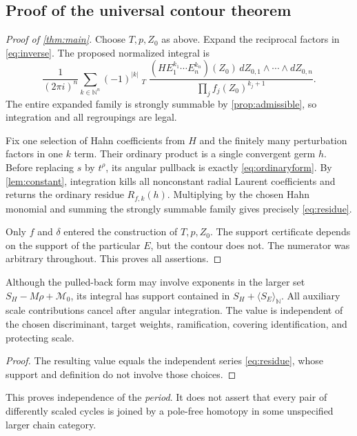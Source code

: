 \documentclass[11pt,letterpaper]{article}
\theoremstyle{definition}
\theoremstyle{remark}
\newcommand{\N}{\mathbb N}\newcommand{\Z}{\mathbb Z}\newcommand{\Q}{\mathbb Q}
\newcommand{\HInt}{\mathop{\int^{\!H}}\nolimits}
\newcommand{\powers}[1]{\langle #1\rangle_{\N}}
\numberwithin{equation}{section}
\begin{document}
\subsection{Proof of the universal contour theorem}
\begin{proof}[Proof of \cref{thm:main}]
Choose $T,p,Z_0$ as above. Expand the reciprocal factors in
\eqref{eq:inverse}. The proposed normalized integral is
\begin{equation}\label{eq:expandedintegral}
 \frac1{(2\pi i)^n}
 \sum_{k\in\N^n}(-1)^{|k|}
 \HInt_T
 \frac{(HE_1^{k_1}\cdots E_n^{k_n})(Z_0)
 \,dZ_{0,1}\wedge\cdots\wedge dZ_{0,n}}
 {\prod_j f_j(Z_0)^{k_j+1}}.
\end{equation}
The entire expanded family is strongly summable by
\cref{prop:admissible}, so integration and all regroupings are legal.

Fix one selection of Hahn coefficients from $H$ and the finitely many
perturbation factors in one $k$ term. Their ordinary product is a single
convergent germ $h$. Before replacing $s$ by $t^\rho$, its angular pullback
is exactly \eqref{eq:ordinaryform}. By \cref{lem:constant}, integration kills
all nonconstant radial Laurent coefficients and returns the ordinary residue
$R_{f,k}(h)$. Multiplying by the chosen Hahn monomial and summing the
strongly summable family gives precisely \eqref{eq:residue}.

Only $f$ and $\delta$ entered the construction of $T,p,Z_0$. The support
certificate depends on the support of the particular $E$, but the contour does
not. The numerator was arbitrary throughout. This proves all assertions.
\end{proof}

\begin{corollary}\label{cor:cancel}
Although the pulled-back form may involve exponents in the larger set
$S_H-M\rho+\mathcal M_0$, its integral has support contained in
$S_H+\powers{S_E}$. All auxiliary scale contributions cancel after angular
integration. The value is independent of the chosen discriminant, target
weights, ramification, covering identification, and protecting scale.
\end{corollary}
\begin{proof}
The resulting value equals the independent series \eqref{eq:residue}, whose
support and definition do not involve those choices.
\end{proof}

This proves independence of the \emph{period}. It does not assert that every
pair of differently scaled cycles is joined by a pole-free homotopy in some
unspecified larger chain category.
\end{document}
